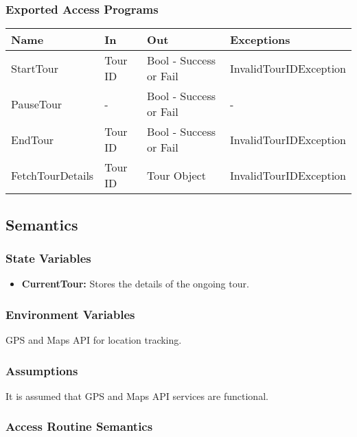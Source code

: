 \documentclass[12pt, titlepage]{article}
\begin{document}
\subsubsection{Exported Access Programs}

\begin{center}
\begin{tabular}{p{4cm} p{2cm} p{4cm} p{4cm}}
\hline
\textbf{Name} & \textbf{In} & \textbf{Out} & \textbf{Exceptions} \\
\hline
StartTour & Tour ID & Bool - Success or Fail & InvalidTourIDException \\
\hline
PauseTour & - & Bool - Success or Fail & - \\
\hline
EndTour & Tour ID & Bool - Success or Fail & InvalidTourIDException \\
\hline
FetchTourDetails & Tour ID & Tour Object & InvalidTourIDException \\
\hline
\end{tabular}
\end{center}

\subsection{Semantics}

\subsubsection{State Variables}

\begin{itemize}
    \item \textbf{CurrentTour:} Stores the details of the ongoing tour.
\end{itemize}

\subsubsection{Environment Variables}

GPS and Maps API for location tracking.

\subsubsection{Assumptions}

It is assumed that GPS and Maps API services are functional.

\subsubsection{Access Routine Semantics}
\end{document}
